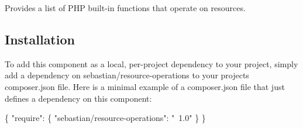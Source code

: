 Provides a list of P\+HP built-\/in functions that operate on resources.

\subsection*{Installation}

To add this component as a local, per-\/project dependency to your project, simply add a dependency on {\ttfamily sebastian/resource-\/operations} to your project\textquotesingle{}s {\ttfamily composer.\+json} file. Here is a minimal example of a {\ttfamily composer.\+json} file that just defines a dependency on this component\+:


\begin{DoxyCode}
\{
    "require": \{
        "sebastian/resource-operations": "~1.0"
    \}
\}
\end{DoxyCode}
 